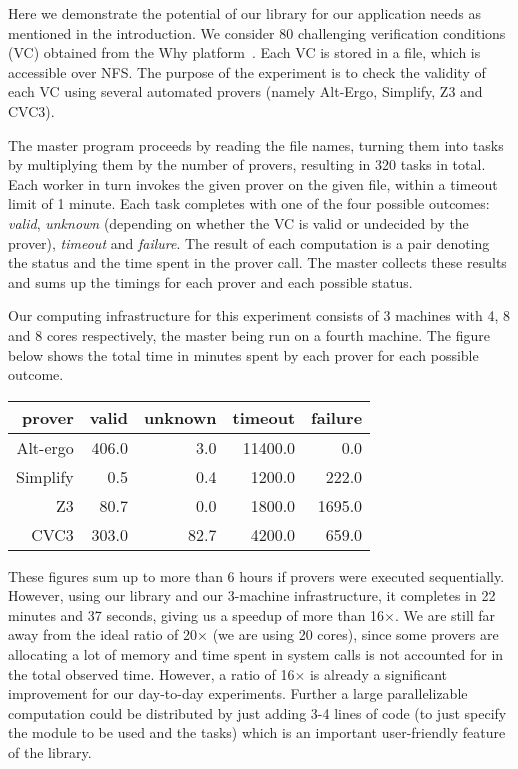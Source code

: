 \documentclass{llncs}
\begin{document}
Here we demonstrate the potential of our library for our application
needs as mentioned in the introduction. 
We consider 80 challenging verification conditions
(VC) obtained from the Why platform~\cite{filliatre07cav}.  Each
VC is stored in a file, which is accessible over
NFS. The purpose of the experiment is to check the validity of each VC
using several automated provers (namely Alt-Ergo, Simplify, Z3 and CVC3).

The master program proceeds by reading the file names, turning them
into tasks by multiplying them by the number of provers, resulting in
320 tasks in total.
Each worker in turn invokes the given prover on the given file, within
a timeout limit of 1 minute.
Each task completes with one of the four possible outcomes: \emph{valid},
\emph{unknown} (depending on
whether the VC is valid or undecided by the prover), 
\emph{timeout} and \emph{failure}.
The result of each computation is a pair denoting the status and the
time spent in the prover call. The master collects these results and
sums up the timings for each prover and each possible status.

Our computing
infrastructure for this experiment consists of 3 machines with 4, 8 and 8 cores
respectively, the master being run on a fourth machine. 
The figure below shows the total time in minutes spent by each prover
for each possible outcome.
\begin{center}
  \begin{tabular}{|r||r|r|r|r|}
    \hline
    prover   & valid & unknown & timeout & failure
    \\\hline\hline
    Alt-ergo & 406.0 & 3.0   &  11400.0 & 0.0       
    \\\hline
    Simplify &  0.5   & 0.4   &  1200.0 & 222.0   
    \\\hline
    Z3       & 80.7   & 0.0   &  1800.0 & 1695.0   
    \\\hline
    CVC3     & 303.0  & 82.7  &  4200.0 & 659.0   
    \\\hline
  \end{tabular}
\end{center}
These figures sum up to more than 6 hours if provers were executed
sequentially. However, using our library and our 3-machine
infrastructure, it completes in 22 minutes and 37 seconds, giving us a
speedup of more than 16$\times$. We are still far away from the ideal
ratio of 20$\times$ (we are using 20 cores), since some provers are
allocating a lot of memory and time spent in system calls is not
accounted for in the total observed time. However, a ratio of
16$\times$ is already a significant improvement for our day-to-day
experiments. Further a large parallelizable computation could be
distributed by just adding 3-4 lines of code (to just specify the module
to be used and the tasks) which is an important user-friendly feature
of the library.
\end{document}
